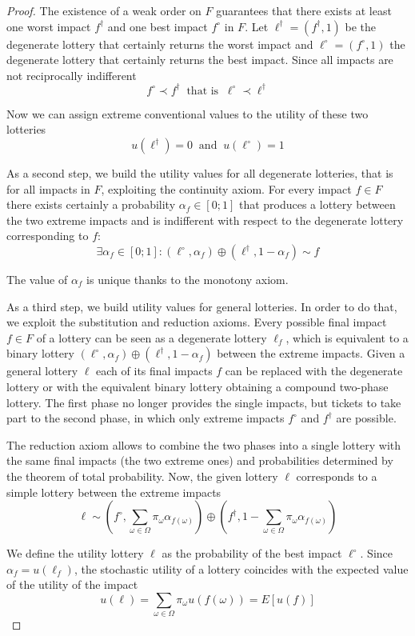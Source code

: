 \begin{proof}
	The existence of a weak order on $F$ guarantees that there exists at least one worst impact $f^\dag$ and one best impact $f^\circ$ in $F$. Let $\ell^\dag = (f^\dag, 1)$ be the degenerate lottery that certainly returns the worst impact and $\ell^\circ = (f^\circ, 1)$ the degenerate lottery that certainly returns the best impact.  Since all impacts are not reciprocally indifferent
	$$ f^\circ \prec f^\dag \ \text{ that is } \ \ell^\circ \prec \ell^\dag $$
	
	Now we can assign extreme conventional values to the utility of these two lotteries
	$$ u(\ell^\dag) = 0 \ \text{ and } \ u(\ell^\circ) = 1 $$
	
	As a second step, we build the utility values for all degenerate lotteries, that is for all impacts in $F$, exploiting the continuity axiom. For every impact $f \in F$ there exists certainly a probability $\alpha_f \in [0;1]$ that produces a lottery between the two extreme impacts and is indifferent with respect to the degenerate lottery corresponding to $f$: 
	$$ \exists \alpha_f \in [0;1] : (\ell^\circ, \alpha_f) \oplus (\ell^\dag, 1 - \alpha_f) \sim f $$
	
	The value of $\alpha_f$ is unique thanks to the monotony axiom.
	
	As a third step, we build utility values for general lotteries. In order to do that, we exploit the substitution and reduction axioms. Every possible final impact $f \in F$ of a lottery can be seen as a degenerate lottery $\ell_f$, which is equivalent to a binary lottery $(\ell^\circ, \alpha_f) \oplus (\ell^\dag, 1 - \alpha_f)$ between the extreme impacts. Given a general lottery $\ell$ each of its final impacts $f$ can be replaced with the degenerate lottery or with the equivalent binary lottery obtaining a compound two-phase lottery. The first phase no longer provides the single impacts, but tickets to take part to the second phase, in which only extreme impacts $f^\circ$ and $f^\dag$ are possible.
	
	The reduction axiom allows to combine the two phases into a single lottery with the same final impacts (the two extreme ones) and probabilities determined by the theorem of total probability. Now, the given lottery $\ell$ corresponds to a simple lottery between the extreme impacts
	$$ \ell \sim \left(f^\circ, \sum_{\omega \in \Omega} \pi_\omega \alpha_{f(\omega)} \right) \oplus \left(f^\dag, 1 - \sum_{\omega \in \Omega} \pi_\omega \alpha_{f(\omega)}\right) $$
	
	We define the utility lottery $\ell$ as the probability of the best impact $\ell^\circ$. Since $\alpha_f = u(\ell_f)$, the stochastic utility of a lottery coincides with the expected value of the utility of the impact
	$$ u(\ell) = \sum_{\omega \in \Omega} \pi_\omega u(f(\omega)) = E \left[u(f)\right] $$
\end{proof}

